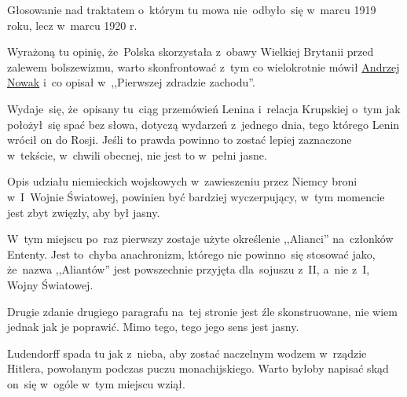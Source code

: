\documentclass[a4paper,11pt]{article}
\begin{document}
\vspace{\spaceFour}


\start {} Głosowanie nad traktatem o~którym tu mowa
nie~odbyło~się w~marcu 1919 roku, lecz w~marcu 1920 r.

\vspace{\spaceFour}


\start {} Wyrażoną tu opinię, że~Polska skorzystała z~obawy
Wielkiej Brytanii przed zalewem bolszewizmu, warto skonfrontować z~tym
co wielokrotnie mówił
\href{https://www.youtube.com/watch?v=yfQ7rpq_irA}{Andrzej Nowak} i~co
opisał w~,,Pierwszej zdradzie zachodu''.

\vspace{\spaceFour}


\start {} Wydaje~się, że~opisany tu~ciąg przemówień Lenina
i~relacja Krupskiej o~tym jak położył~się spać bez słowa, dotyczą
wydarzeń z~jednego dnia, tego którego Lenin wrócił on do Rosji. Jeśli
to prawda powinno to zostać lepiej zaznaczone w~tekście, w~chwili
obecnej, nie jest to w~pełni jasne.

\vspace{\spaceFour}


\start {} Opis udziału niemieckich wojskowych w~zawieszeniu
przez Niemcy broni w~I~Wojnie Światowej, powinien być bardziej
wyczerpujący, w~tym momencie jest zbyt zwięzły, aby był jasny.

\vspace{\spaceFour}


\start {} W~tym miejscu po~raz pierwszy zostaje użyte
określenie ,,Alianci'' na~członków Ententy. Jest to~chyba anachronizm,
którego nie powinno~się stosować jako, że~nazwa ,,Aliantów'' jest
powszechnie przyjęta dla~sojuszu z~II, a~nie z~I, Wojny Światowej.

\vspace{\spaceFour}


\start {} Drugie zdanie drugiego paragrafu na~tej stronie jest
źle skonstruowane, nie wiem jednak jak je poprawić. Mimo tego, tego
jego sens jest jasny.

\vspace{\spaceFour}


\start {} Ludendorff spada tu jak z~nieba, aby zostać naczelnym
wodzem w~rządzie Hitlera, powołanym podczas puczu monachijskiego.
Warto byłoby napisać skąd on~się w~ogóle w~tym miejscu wziął.

\vspace{\spaceFour}
\end{document}
